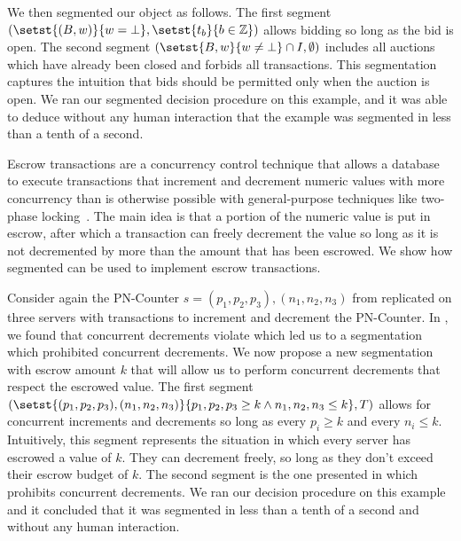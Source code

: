 We then segmented our object as follows. The first segment $(\setst{(B, w)}{w =
\bot}, \setst{t_b}{b \in \ints})$ allows bidding so long as the bid is open.
The second segment $(\setst{B, w}{w \neq \bot} \cap I, \emptyset)$ includes all
auctions which have already been closed and forbids all transactions. This
segmentation captures the intuition that bids should be permitted only when the
auction is open. We ran our segmented \invariantconfluence{} decision procedure
on this example, and it was able to deduce without any human interaction that
the example was segmented \invariantconfluent{} in less than a tenth of a
second.

Escrow transactions are a concurrency control technique that allows a database
to execute transactions that increment and decrement numeric values with more
concurrency than is otherwise possible with general-purpose techniques like
two-phase locking~\cite{o1986escrow}. The main idea is that a portion of the
numeric value is put in escrow, after which a transaction can freely decrement
the value so long as it is not decremented by more than the amount that has
been escrowed. We show how segmented \invariantconfluence{} can be used to
implement escrow transactions.

Consider again the PN-Counter $s = (p_1, p_2, p_3), (n_1, n_2, n_3)$ from
 replicated on three servers with transactions
to increment and decrement the PN-Counter. In
, we found that concurrent decrements violate
\invariantconfluence{} which led us to a segmentation which prohibited
concurrent decrements. We now propose a new segmentation with escrow amount $k$
that will allow us to perform concurrent decrements that respect the escrowed
value. The first segment $(\setst{(p_1, p_2, p_3), (n_1, n_2, n_3)}{p_1, p_2,
p_3 \geq k \land n_1, n_2, n_3 \leq k}, T)$ allows for concurrent increments
and decrements so long as every $p_i \geq k$ and every $n_i \leq k$.
Intuitively, this segment represents the situation in which every server has
escrowed a value of $k$. They can decrement freely, so long as they don't
exceed their escrow budget of $k$. The second segment is the one presented in
 which prohibits concurrent decrements. We ran
our decision procedure on this example and it concluded that it was segmented
\invariantconfluent{} in less than a tenth of a second and without any human
interaction.

